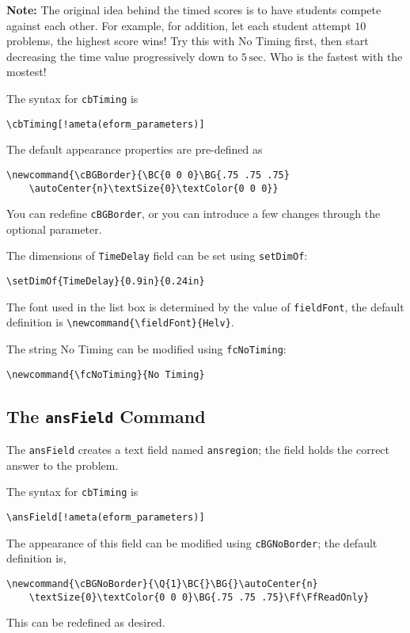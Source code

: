 \documentclass{article}
\makeatletter
\let\uif\textsf
\let\bslash=\@backslashchar
\def\cs#1{\texttt{\bslash#1}}
\makeatother
\begin{document}
\newtopic\noindent\textbf{Note:} The original idea behind the timed scores is to have
students compete against each other. For example, for addition, let each
student attempt $10$ problems, the highest score wins! Try this with
\uif{No Timing} first, then start decreasing the time value
progressively down to $5\,\text{sec}$. Who is the fastest with the mostest!

The syntax for \cs{cbTiming} is
\begin{Verbatim}[xleftmargin=\amtIndent,commandchars=!()]
\cbTiming[!ameta(eform_parameters)]
\end{Verbatim}
The default appearance properties are pre-defined as
\begin{Verbatim}[xleftmargin=\amtIndent]
\newcommand{\cBGBorder}{\BC{0 0 0}\BG{.75 .75 .75}
    \autoCenter{n}\textSize{0}\textColor{0 0 0}}
\end{Verbatim}
You can redefine \cs{cBGBorder}, or you can introduce a few changes through
the optional parameter.

The dimensions of \texttt{TimeDelay} field can be set using \cs{setDimOf}:
\begin{Verbatim}[xleftmargin=\amtIndent]
\setDimOf{TimeDelay}{0.9in}{0.24in}
\end{Verbatim}
The font used in the list box is determined by the value of \cs{fieldFont},
the default definition is \verb!\newcommand{\fieldFont}{Helv}!.

The string \uif{No Timing} can be modified using \cs{fcNoTiming}:
\begin{Verbatim}[xleftmargin=\amtIndent]
\newcommand{\fcNoTiming}{No Timing}
\end{Verbatim}


\subsection{The \texorpdfstring{\protect\cs{ansField}}{} Command}\label{ansField}

The \cs{ansField} creates a text field named \texttt{ansregion}; the field
holds the correct answer to the problem.

The syntax for \cs{cbTiming} is
\begin{Verbatim}[xleftmargin=\amtIndent,commandchars=!()]
\ansField[!ameta(eform_parameters)]
\end{Verbatim}
The appearance of this field can be modified using \cs{cBGNoBorder}; the default definition is,
\begin{Verbatim}[xleftmargin=\amtIndent]
\newcommand{\cBGNoBorder}{\Q{1}\BC{}\BG{}\autoCenter{n}
    \textSize{0}\textColor{0 0 0}\BG{.75 .75 .75}\Ff\FfReadOnly}
\end{Verbatim}
This can be redefined as desired.
\end{document}
